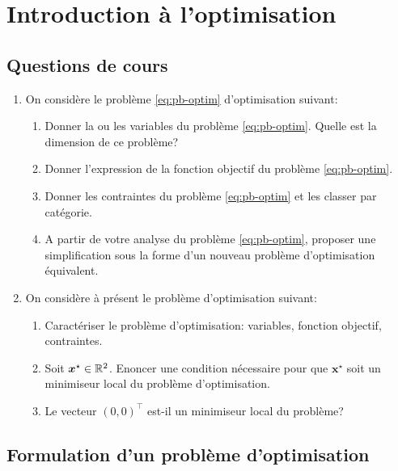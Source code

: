 \chapter{Introduction à l'optimisation}

\section{Questions de cours}

\begin{enumerate}
	\item On considère le problème \eqref{eq:pb-optim} d'optimisation suivant:
	\begin{enumerate}
		\item Donner la ou les variables du problème \eqref{eq:pb-optim}. Quelle est la dimension de ce problème?
		\item Donner l'expression de la fonction objectif du problème \eqref{eq:pb-optim}.
		\item Donner les contraintes du problème \eqref{eq:pb-optim} et les classer par catégorie.
		\item A partir de votre analyse du problème \eqref{eq:pb-optim}, proposer une simplification sous la forme d'un nouveau problème d'optimisation équivalent.
	\end{enumerate}
	
	\item On considère à présent le problème d'optimisation suivant:
	\begin{enumerate}
		\item Caractériser le problème d'optimisation: variables, fonction objectif, contraintes.
		\item Soit $\bm{x}^\star \in \mathbb{R}^2$. Enoncer une condition nécessaire pour que $\bm{x}^\star$ soit un minimiseur local du problème d'optimisation.
		\item Le vecteur $(0,0)^\top$ est-il un minimiseur local du problème?
	\end{enumerate}
\end{enumerate}


\section{Formulation d'un problème d'optimisation}

